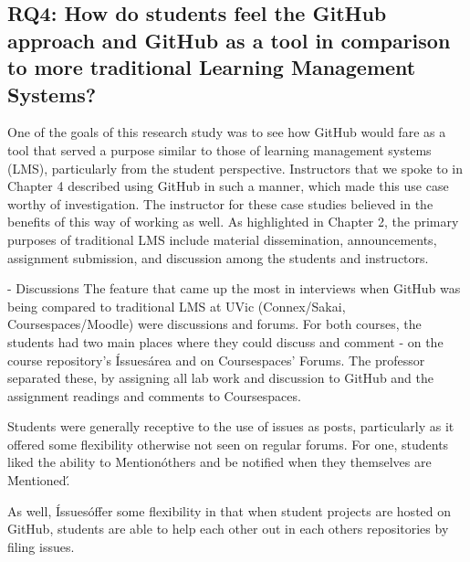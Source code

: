 




\subsection{RQ4: How do students feel the GitHub approach and GitHub as a tool in comparison to more traditional Learning Management Systems?}
One of the goals of this research study was to see how GitHub would fare as a tool that served a purpose similar to those of learning management systems (LMS), particularly from the student perspective. Instructors that we spoke to in Chapter 4 described using GitHub in such a manner, which made this use case worthy of investigation. The instructor for these case studies believed in the benefits of this way of working as well. As highlighted in Chapter 2, the primary purposes of traditional LMS include material dissemination, announcements, assignment submission, and discussion among the students and instructors.

- Discussions
The feature that came up the most in interviews when GitHub was being compared to traditional LMS at UVic (Connex/Sakai, Coursespaces/Moodle) were discussions and forums. For both courses, the students had two main places where they could discuss and comment - on the course repository's \'Issues\' area and on Coursespaces' Forums. The professor separated these, by assigning all lab work and discussion to GitHub and the assignment readings and comments to Coursespaces.

Students were generally receptive to the use of issues as posts, particularly as it offered some flexibility otherwise not seen on regular forums. For one, students liked the ability to \'Mention\' others and be notified when they themselves are \'Mentioned\'. %

As well, \'Issues\' offer some flexibility in that when student projects are hosted on GitHub, students are able to help each other out in each others repositories by filing issues. %

